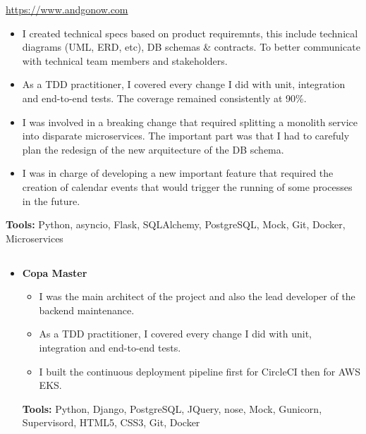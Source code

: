 \documentclass[11pt,a4paper,english]{moderncv}
\begin{document}
{\begin{itemize}
        \newline{}
        \url{https://www.andgonow.com}
        \begin{itemize}
            \item I created technical specs based on product requiremnts, this include technical diagrams (UML, ERD, etc), DB schemas \& contracts. To better communicate with technical team members and stakeholders.
            \item As a TDD practitioner, I covered every change I did with unit, integration and end-to-end tests. The coverage remained consistently at 90\%.
            \item I was involved in a breaking change that required splitting a monolith service into disparate microservices. The important part was that I had to carefuly plan the redesign of the new arquitecture of the DB schema.
            \item I was in charge of developing a new important feature that required the creation of calendar events that would trigger the running of some processes in the future.
        \end{itemize}
        \textbf{Tools:} Python, asyncio, Flask, SQLAlchemy, PostgreSQL, Mock, Git, Docker, Microservices
\end{itemize}
}

\subsection{}

{
\begin{itemize}
    \item \textbf{Copa Master}
        \begin{itemize}
            \item I was the main architect of the project and also the lead developer of the backend maintenance.
            \item As a TDD practitioner, I covered every change I did with unit, integration and end-to-end tests.
            \item I built the continuous deployment pipeline first for CircleCI then for AWS EKS.
        \end{itemize}
        \textbf{Tools:} Python, Django, PostgreSQL, JQuery, nose, Mock, Gunicorn, Supervisord, HTML5, CSS3, Git, Docker
\end{itemize}
}

\subsection{}
\end{document}
